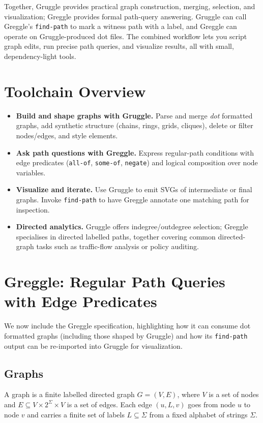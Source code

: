\documentclass[11pt]{article}
\begin{document}
Together, Gruggle provides practical graph construction, merging, selection, and visualization; Greggle provides formal path-query answering. Gruggle can call Greggle's \texttt{find-path} to mark a witness path with a label, and Greggle can operate on Gruggle-produced dot files. The combined workflow lets you script graph edits, run precise path queries, and visualize results, all with small, dependency-light tools.

\section{Toolchain Overview}

\begin{itemize}[leftmargin=*]
  \item \textbf{Build and shape graphs with Gruggle.} Parse and merge {\em dot} formatted graphs, add synthetic structure (chains, rings, grids, cliques), delete or filter nodes/edges, and style elements.
  \item \textbf{Ask path questions with Greggle.} Express regular-path conditions with edge predicates (\texttt{all-of}, \texttt{some-of}, \texttt{negate}) and logical composition over node variables.
  \item \textbf{Visualize and iterate.} Use Gruggle to emit SVGs of intermediate or final graphs. Invoke \texttt{find-path} to have Greggle annotate one matching path for inspection.
  \item \textbf{Directed analytics.} Gruggle offers indegree/outdegree selection; Greggle specialises in directed labelled paths, together covering common directed-graph tasks such as traffic-flow analysis or policy auditing.
\end{itemize}

\section{Greggle: Regular Path Queries with Edge Predicates}

We now include the Greggle specification, highlighting how it can consume dot formatted graphs (including those shaped by Gruggle) and how its \texttt{find-path} output can be re-imported into Gruggle for visualization.

\subsection{Graphs}
\label{sectionOnGraphs}
A graph is a finite labelled directed graph $G = (V,E)$, where $V$ is a set of nodes and $E \subseteq V \times 2^{\Sigma} \times V$ is a set of edges. Each edge $(u,L,v)$ goes from node $u$ to node $v$ and carries a finite set of labels $L \subseteq \Sigma$ from a fixed alphabet of strings $\Sigma$.
\end{document}
